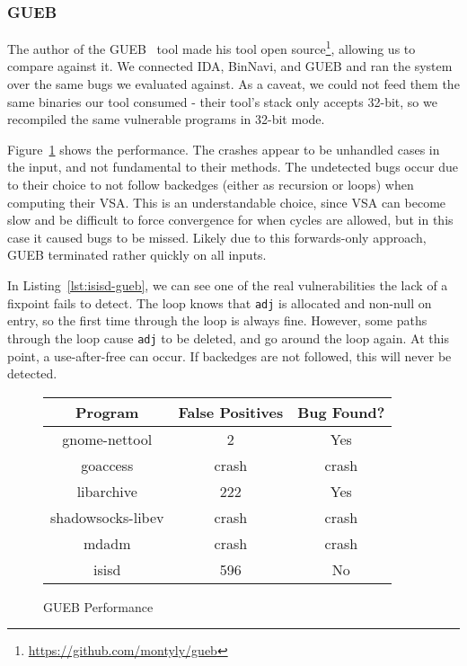 \subsubsection{GUEB}
The author of the GUEB~\cite{gueb} tool made his tool open source\footnote{
	\url{https://github.com/montyly/gueb}
}, allowing us to compare against it.
We connected IDA, BinNavi, and GUEB and ran the system over the same bugs we evaluated against.
As a caveat, we could not feed them the same binaries our tool consumed - their tool's stack only accepts 32-bit, so we recompiled the same vulnerable programs in 32-bit mode.

Figure~\ref{fig:guebperf} shows the performance.
The crashes appear to be unhandled cases in the input, and not fundamental to their methods.
The undetected bugs occur due to their choice to not follow backedges (either as recursion or loops) when computing their VSA.
This is an understandable choice, since VSA can become slow and be difficult to force convergence for when cycles are allowed, but in this case it caused bugs to be missed.
Likely due to this forwards-only approach, GUEB terminated rather quickly on all inputs.

In Listing~\ref{lst:isisd-gueb}, we can see one of the real vulnerabilities the lack of a fixpoint fails to detect.
The loop knows that \texttt{adj} is allocated and non-null on entry, so the first time through the loop is always fine.
However, some paths through the loop cause \texttt{adj} to be deleted, and go around the loop again.
At this point, a use-after-free can occur.
If backedges are not followed, this will never be detected.

\begin{figure}
\begin{center}
\begin{tabular}{|c||c|c|}
\hline
Program & False Positives & Bug Found? \\
\hline \hline
	gnome-nettool & 2 & Yes\\
	goaccess & crash & crash\\
	libarchive & 222 & Yes\\
	shadowsocks-libev & crash & crash\\
	mdadm & crash & crash\\
	isisd & 596 & No\\
\hline
\end{tabular}
\end{center}
\caption{GUEB Performance}
\label{fig:guebperf}
\end{figure}

